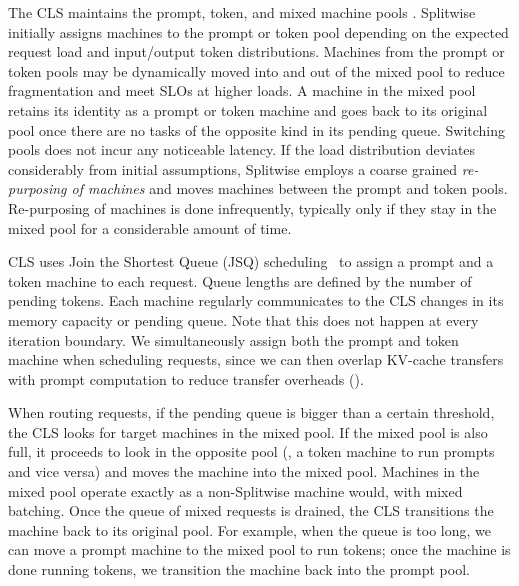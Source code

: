 The CLS maintains the prompt, token, and mixed machine pools .
Splitwise initially assigns machines to the prompt or token pool depending on the expected request load and input/output token distributions.
Machines from the prompt or token pools may be dynamically moved into and out of the mixed pool to reduce fragmentation and meet SLOs at higher loads. 
A machine in the mixed pool retains its identity as a prompt or token machine and goes back to its original pool once there are no tasks of the opposite kind in its pending queue.
Switching pools does not incur any noticeable latency.
If the load distribution deviates considerably from initial assumptions, Splitwise employs a coarse grained \emph{re-purposing of machines} and moves machines between the prompt and token pools.
Re-purposing of machines is done infrequently, typically only if they stay in the mixed pool for a considerable amount of time.

CLS uses Join the Shortest Queue (JSQ) scheduling~\cite{jsq1,jsq2} to assign a prompt and a token machine to each request.
Queue lengths are defined by the number of pending tokens.
Each machine regularly communicates to the CLS changes in its memory capacity or pending queue.
Note that this does not happen at every iteration boundary.
We simultaneously assign both the prompt and token machine when scheduling requests, since we can then overlap KV-cache transfers with prompt computation to reduce transfer overheads ().

When routing requests, if the pending queue is bigger than a certain threshold, the CLS looks for target machines in the mixed pool.
If the mixed pool is also full, it proceeds to look in the opposite pool (\ie, a token machine to run prompts and vice versa) and moves the machine into the mixed pool.
Machines in the mixed pool operate exactly as a non-Splitwise machine would, with mixed batching.
Once the queue of mixed requests is drained, the CLS transitions the machine back to its original pool.
For example, when the queue is too long, we can move a prompt machine to the mixed pool to run tokens; once the machine is done running tokens, we transition the machine back into the prompt pool.


